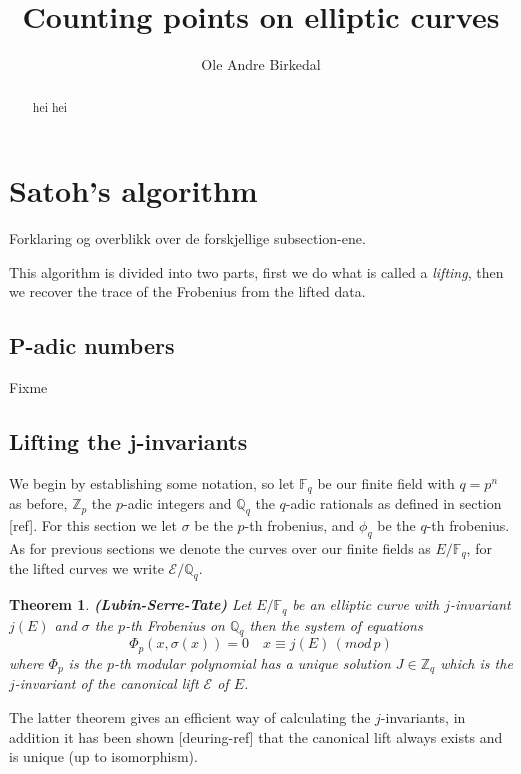 \documentclass[a4paper,10pt]{amsart}
\title{Counting points on elliptic curves}
\author{Ole Andre Birkedal}
\begin{document}
\newtheorem{thm}{Theorem}
\newtheorem{mydef}{Definition}
\newtheorem{ex}{Example}
\newtheorem{prop}{Proposition}
\newtheorem{lemma}{Lemma}

\begin{abstract}
hei hei
\end{abstract}

\maketitle
\tableofcontents






\section{Satoh's algorithm}
Forklaring og overblikk over de forskjellige subsection-ene.

This algorithm is divided into two parts, first we do what is called a \emph{lifting}, then
we recover the trace of the Frobenius from the lifted data.
\subsection{P-adic numbers}
Fixme
\subsection{Lifting the j-invariants}
We begin by establishing some notation, so let $\mathbb{F}_q$ be our finite field with $q=p^n$ as before,
$\mathbb{Z}_p$ the $p$-adic integers and $\mathbb{Q}_q$ the $q$-adic rationals as defined in section [ref].
For this section we let $\sigma$ be the $p$-th frobenius, and $\phi_q$ be the $q$-th frobenius.
As for previous sections we denote the curves over our finite fields as $E/\mathbb{F}_q$,
for the lifted curves we write $\mathscr{E}/\mathbb{Q}_q$.

\begin{thm}
 \textbf{(Lubin-Serre-Tate)} Let $E/\mathbb{F}_q$ be an elliptic curve with $j$-invariant $j(E)$ and
$\sigma$ the $p$-th Frobenius on $\mathbb{Q}_q$ then the system of equations
$$ \Phi_p(x, \sigma(x)) = 0 \quad x \equiv j(E) \, (mod\, p)$$
where $\Phi_p$ is the $p$-th modular polynomial has a unique solution $J \in \mathbb{Z}_q$ 
which is the $j$-invariant of the canonical lift $\mathscr{E}$ of $E$.
\end{thm}
The latter theorem gives an efficient way of calculating the $j$-invariants, in addition it has
been shown [deuring-ref] that the canonical lift always exists and is unique (up to isomorphism).
\end{document}
